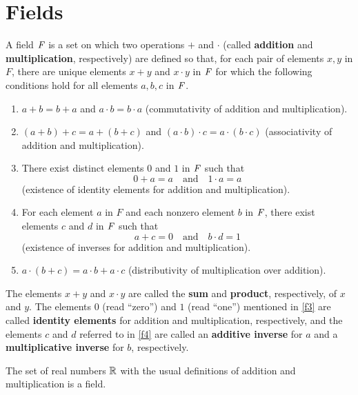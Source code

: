 \chapter{Fields}\label{ch:c}

\begin{defn}\label{c.0.1}
  A field \(\mathit{F}\) is a set on which two operations \(+\) and \(\cdot\) (called \textbf{addition} and \textbf{multiplication}, respectively) are defined so that, for each pair of elements \(x, y\) in \(F\), there are unique elements \(x + y\) and \(x \cdot y\) in \(\mathit{F}\) for which the following conditions hold for all elements \(a, b, c\) in \(\mathit{F}\).
  \begin{enumerate}[label=(F \arabic*), ref=F \arabic*]
    \item\label{f1} \(a + b = b + a\) and \(a \cdot b = b \cdot a\)
    (commutativity of addition and multiplication).
    \item\label{f2} \((a + b) + c = a + (b + c)\) and \((a \cdot b) \cdot c = a \cdot (b \cdot c)\)
    (associativity of addition and multiplication).
    \item\label{f3} There exist distinct elements \(0\) and \(1\) in \(\mathit{F}\) such that
    \[
      0 + a = a \quad \text{and} \quad 1 \cdot a = a
    \]
    (existence of identity elements for addition and multiplication).
    \item\label{f4} For each element \(a\) in \(F\) and each nonzero element \(b\) in \(\mathit{F}\), there exist elements \(c\) and \(d\) in \(\mathit{F}\) such that
    \[
      a + c = 0 \quad \text{and} \quad b \cdot d = 1
    \]
    (existence of inverses for addition and multiplication).
    \item\label{f5} \(a \cdot (b + c) = a \cdot b + a \cdot c\)
    (distributivity of multiplication over addition).
  \end{enumerate}
  The elements \(x + y\) and \(x \cdot y\) are called the \textbf{sum} and \textbf{product}, respectively, of \(x\) and \(y\).
  The elements \(0\) (read ``zero'') and \(1\) (read ``one'') mentioned in \ref{f3} are called \textbf{identity elements} for addition and multiplication, respectively, and the elements \(c\) and \(d\) referred to in \ref{f4} are called an \textbf{additive inverse} for \(a\) and a \textbf{multiplicative inverse} for \(b\), respectively.
\end{defn}

\begin{eg}\label{c.0.2}
  The set of real numbers \(\mathbb{R}\) with the usual definitions of addition and multiplication is a field.
\end{eg}


